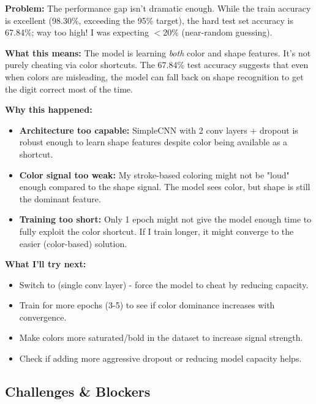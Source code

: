 \documentclass[9pt,a4paper,twocolumn,twoside]{tau-class/tau}
\begin{document}
        \begin{note}
            \textbf{Problem:} The performance gap isn't dramatic enough. While the train accuracy is excellent (98.30\%, exceeding the 95\% target), the hard test set accuracy is 67.84\%; way too high! I was expecting $<$20\% (near-random guessing).
            
            \textbf{What this means:} The model is learning \textit{both} color and shape features. It's not purely cheating via color shortcuts. The 67.84\% test accuracy suggests that even when colors are misleading, the model can fall back on shape recognition to get the digit correct most of the time.
            
            \textbf{Why this happened:}
            \begin{itemize}
                \item \textbf{Architecture too capable:} SimpleCNN with 2 conv layers + dropout is robust enough to learn shape features despite color being available as a shortcut.
                \item \textbf{Color signal too weak:} My stroke-based coloring might not be "loud" enough compared to the shape signal. The model sees color, but shape is still the dominant feature.
                \item \textbf{Training too short:} Only 1 epoch might not give the model enough time to fully exploit the color shortcut. If I train longer, it might converge to the easier (color-based) solution.
            \end{itemize}
            
            \textbf{What I'll try next:} 
            \begin{itemize}
                \item Switch to  (single conv layer) - force the model to cheat by reducing capacity.
                \item Train for more epochs (3-5) to see if color dominance increases with convergence.
                \item Make colors more saturated/bold in the dataset to increase signal strength.
                \item Check if adding more aggressive dropout or reducing model capacity helps.
            \end{itemize}
        \end{note}
        
    \subsection{Challenges \& Blockers}
    
\end{document}
